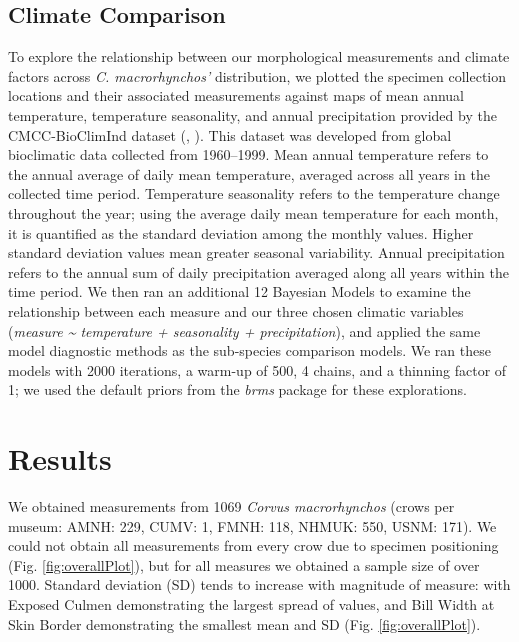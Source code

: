\documentclass[10pt,a4paper]{article}
\begin{document}
\subsection{Climate Comparison}\label{climate-comparison}

To explore the relationship between our morphological measurements and climate factors across \emph{C. macrorhynchos'} distribution, we plotted the specimen collection locations and their associated measurements against maps of mean annual temperature, temperature seasonality, and annual precipitation provided by the CMCC-BioClimInd dataset (, ).
This dataset was developed from global bioclimatic data collected from 1960--1999.
Mean annual temperature refers to the annual average of daily mean temperature, averaged across all years in the collected time period.
Temperature seasonality refers to the temperature change throughout the year; using the average daily mean temperature for each month, it is quantified as the standard deviation among the monthly values.
Higher standard deviation values mean greater seasonal variability.
Annual precipitation refers to the annual sum of daily precipitation averaged along all years within the time period.
We then ran an additional 12 Bayesian Models to examine the relationship between each measure and our three chosen climatic variables (\emph{measure \textasciitilde{} temperature + seasonality + precipitation}), and applied the same model diagnostic methods as the sub-species comparison models.
We ran these models with 2000 iterations, a warm-up of 500, 4 chains, and a thinning factor of 1; we used the default priors from the \emph{brms} package for these explorations.

\section{Results}\label{results}

We obtained measurements from 1069 \emph{Corvus macrorhynchos} (crows per museum: AMNH: 229, CUMV: 1, FMNH: 118, NHMUK: 550, USNM: 171).
We could not obtain all measurements from every crow due to specimen positioning (Fig. \ref{fig:overallPlot}), but for all measures we obtained a sample size of over 1000.
Standard deviation (SD) tends to increase with magnitude of measure: with Exposed Culmen demonstrating the largest spread of values, and Bill Width at Skin Border demonstrating the smallest mean and SD (Fig. \ref{fig:overallPlot}).
\end{document}
